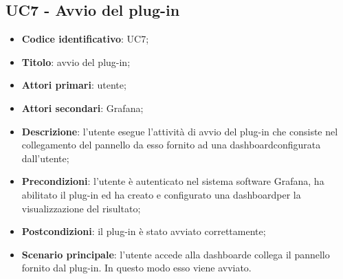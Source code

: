\subsection{UC7 - Avvio del plug-in}
\begin{itemize}
	\item \textbf{Codice identificativo}: UC7;
	\item \textbf{Titolo}: avvio del plug-in;
	\item \textbf{Attori primari}: utente;
	\item \textbf{Attori secondari}: Grafana\glo;
	\item \textbf{Descrizione}: l'utente esegue l'attività di avvio del plug-in che consiste nel collegamento del pannello da esso fornito ad una dashboard\glosp configurata dall'utente;
	\item \textbf{Precondizioni}: l'utente è autenticato nel sistema software Grafana\glo, ha abilitato il plug-in ed ha creato e configurato una dashboard\glosp per la visualizzazione del risultato;
	\item \textbf{Postcondizioni}: il plug-in è stato avviato correttamente;
	\item \textbf{Scenario principale}: l'utente accede alla dashboard\glosp e collega il pannello fornito dal plug-in. In questo modo esso viene avviato.
\end{itemize}
